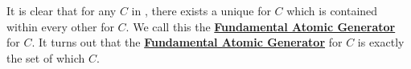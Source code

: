 \newcommand{\FundamentalAtomicGenerator}[0]{\textbf{\hyperref[rmk:FundamentalAtomicGenerator]{Fundamental Atomic Generator}}\xspace}
\begin{rmk}
\label{rmk:FundamentalAtomicGenerator}

\rm
    It is clear that
    for any \WFF $C$ 
    in \scG, 
    there exists a 
    unique \CompleteCollectionOfAtomicStatementLetters
    for $C$ 
    which is contained within every 
    other 
    \CompleteCollectionOfAtomicStatementLetters
    for $C$. 
    We call this the \FundamentalAtomicGenerator
    for $C$. 
    It turns out that the 
    \FundamentalAtomicGenerator for $C$ 
    is exactly the set of \AtomicFormulae
    which
    \AppearsIn
    $C$.      
\end{rmk}
